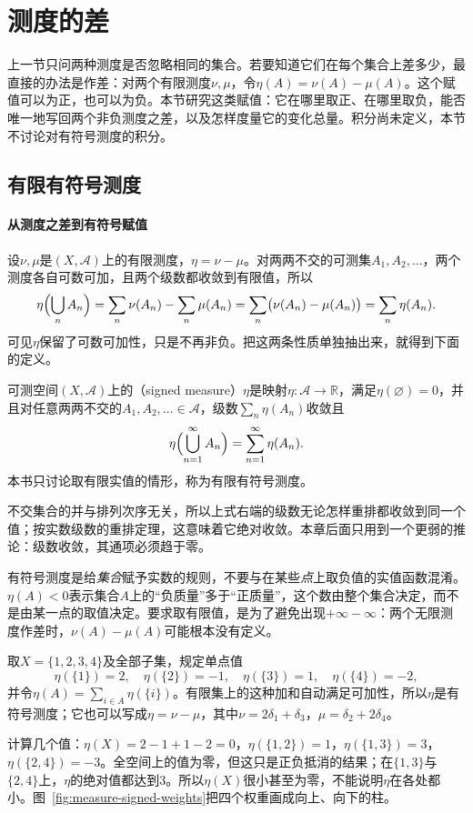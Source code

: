 \section{测度的差}
\label{sec:measure-signed}

上一节只问两种测度是否忽略相同的集合。若要知道它们在每个集合上差多少，最直接的办法是作差：对两个有限测度$\nu,\mu$，令$\eta(A)=\nu(A)-\mu(A)$。这个赋值可以为正，也可以为负。本节研究这类赋值：它在哪里取正、在哪里取负，能否唯一地写回两个非负测度之差，以及怎样度量它的变化总量。积分尚未定义，本节不讨论对有符号测度的积分。

\subsection{有限有符号测度}
\label{sec:measure-signed-finite}

\paragraph{从测度之差到有符号赋值}
设$\nu,\mu$是$(X,\mathcal A)$上的有限测度，$\eta=\nu-\mu$。对两两不交的可测集$A_1,A_2,\dots$，两个测度各自可数可加，且两个级数都收敛到有限值，所以
\[
 \eta\Bigl(\bigcup_nA_n\Bigr)=\sum_n\nu(A_n)-\sum_n\mu(A_n)=\sum_n\bigl(\nu(A_n)-\mu(A_n)\bigr)=\sum_n\eta(A_n).
\]
可见$\eta$保留了可数可加性，只是不再非负。把这两条性质单独抽出来，就得到下面的定义。

\begin{definition}[有限有符号测度]
\label{def:measure-signed}
可测空间$(X,\mathcal A)$上的（signed measure）$\eta$是映射$\eta:\mathcal A\to\mathbb R$，满足$\eta(\varnothing)=0$，并且对任意两两不交的$A_1,A_2,\dots\in\mathcal A$，级数$\sum_n\eta(A_n)$收敛且
\[
 \eta\Bigl(\bigcup_{n=1}^\infty A_n\Bigr)=\sum_{n=1}^\infty\eta(A_n).
\]
本书只讨论取有限实值的情形，称为有限有符号测度。
\end{definition}

不交集合的并与排列次序无关，所以上式右端的级数无论怎样重排都收敛到同一个值；按实数级数的重排定理，这意味着它绝对收敛。本章后面只用到一个更弱的推论：级数收敛，其通项必须趋于零。

有符号测度是给\emph{集合}赋予实数的规则，不要与在某些\emph{点}上取负值的实值函数混淆。$\eta(A)<0$表示集合$A$上的“负质量”多于“正质量”，这个数由整个集合决定，而不是由某一点的取值决定。要求取有限值，是为了避免出现$+\infty-\infty$：两个无限测度作差时，$\nu(A)-\mu(A)$可能根本没有定义。

\begin{example}[正负抵消]
\label{ex:measure-signed-weights}
取$X=\{1,2,3,4\}$及全部子集，规定单点值
\[
 \eta(\{1\})=2,\quad \eta(\{2\})=-1,\quad \eta(\{3\})=1,\quad \eta(\{4\})=-2,
\]
并令$\eta(A)=\sum_{i\in A}\eta(\{i\})$。有限集上的这种加和自动满足可加性，所以$\eta$是有符号测度；它也可以写成$\eta=\nu-\mu$，其中$\nu=2\delta_1+\delta_3$，$\mu=\delta_2+2\delta_4$。

计算几个值：$\eta(X)=2-1+1-2=0$，$\eta(\{1,2\})=1$，$\eta(\{1,3\})=3$，$\eta(\{2,4\})=-3$。全空间上的值为零，但这只是正负抵消的结果；在$\{1,3\}$与$\{2,4\}$上，$\eta$的绝对值都达到$3$。所以$\eta(X)$很小甚至为零，不能说明$\eta$在各处都小。图~\ref{fig:measure-signed-weights}把四个权重画成向上、向下的柱。
\end{example}

